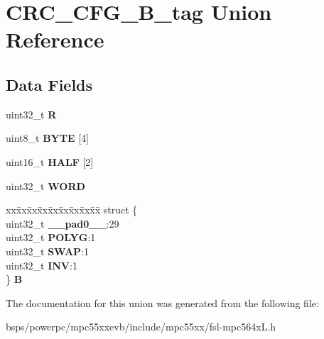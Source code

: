 \hypertarget{unionCRC__CFG__32B__tag}{}\section{C\+R\+C\+\_\+\+C\+F\+G\+\_\+B\+\_\+tag Union Reference}
\label{unionCRC__CFG__32B__tag}
\subsection*{Data Fields}
\begin{DoxyCompactItemize}
\item 
\mbox{\label{unionCRC__CFG__32B__tag_aa699d376eff0a45e97f18d26268b2839}} 
uint32\+\_\+t {\bfseries R}
\item 
\mbox{\label{unionCRC__CFG__32B__tag_aefb3bf1696a20da3e3cb46efea83f877}} 
uint8\+\_\+t {\bfseries B\+Y\+TE} \mbox{[}4\mbox{]}
\item 
\mbox{\label{unionCRC__CFG__32B__tag_ab0b8c4e181bbbdfc65727f0034011fd0}} 
uint16\+\_\+t {\bfseries H\+A\+LF} \mbox{[}2\mbox{]}
\item 
\mbox{\label{unionCRC__CFG__32B__tag_a4b0eb208bcd8ee1629d11f54dc2d12de}} 
uint32\+\_\+t {\bfseries W\+O\+RD}
\item 
\mbox{\label{unionCRC__CFG__32B__tag_a6f1853abeb8d982caad4bbae052bb975}} 
\begin{tabbing}
xx\=xx\=xx\=xx\=xx\=xx\=xx\=xx\=xx\=\kill
struct \{\\
\>uint32\_t {\bfseries \_\_pad0\_\_}:29\\
\>uint32\_t {\bfseries POLYG}:1\\
\>uint32\_t {\bfseries SWAP}:1\\
\>uint32\_t {\bfseries INV}:1\\
\} {\bfseries B}\\

\end{tabbing}\end{DoxyCompactItemize}


The documentation for this union was generated from the following file\+:\begin{DoxyCompactItemize}
\item 
bsps/powerpc/mpc55xxevb/include/mpc55xx/fsl-\/mpc564x\+L.\+h\end{DoxyCompactItemize}
